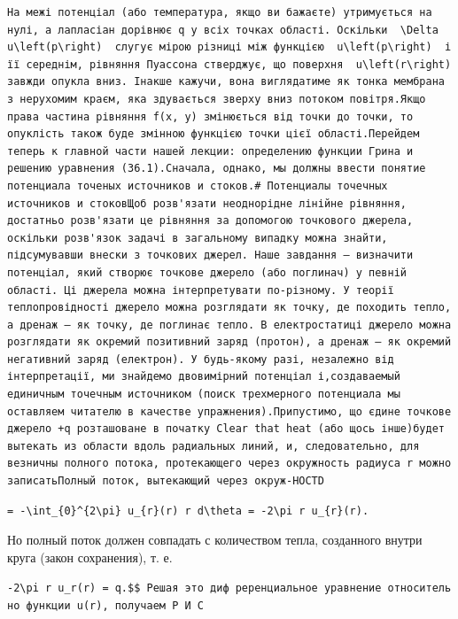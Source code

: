 \documentclass[
  ukrainian,
]{article}
\begin{document}
\begin{verbatim}
На межі потенціал (або температура, якщо ви бажаєте) утримується на нулі, а лапласіан дорівнює q у всіх точках області. Оскільки  \Delta u\left(p\right)  слугує мірою різниці між функцією  u\left(p\right)  і її середнім, рівняння Пуассона стверджує, що поверхня  u\left(r\right)  завжди опукла вниз. Інакше кажучи, вона виглядатиме як тонка мембрана з нерухомим краєм, яка здувається зверху вниз потоком повітря.Якщо права частина рівняння f(x, y) змінюється від точки до точки, то опуклість також буде змінною функцією точки цієї області.Перейдем теперь к главной части нашей лекции: определению функции Грина и решению уравнения (36.1).Сначала, однако, мы должны ввести понятие потенциала точеных источников и стоков.# Потенциалы точечных источников и стоковЩоб розв'язати неоднорідне лінійне рівняння, достатньо розв'язати це рівняння за допомогою точкового джерела, оскільки розв'язок задачі в загальному випадку можна знайти, підсумувавши внески з точкових джерел. Наше завдання — визначити потенціал, який створює точкове джерело (або поглинач) у певній області. Ці джерела можна інтерпретувати по-різному. У теорії теплопровідності джерело можна розглядати як точку, де походить тепло, а дренаж — як точку, де поглинає тепло. В електростатиці джерело можна розглядати як окремий позитивний заряд (протон), а дренаж — як окремий негативний заряд (електрон). У будь-якому разі, незалежно від інтерпретації, ми знайдемо двовимірний потенціал і,создаваемый единичным точечным источником (поиск трехмерного потенциала мы оставляем читателю в качестве упражнения).Припустимо, що єдине точкове джерело +q розташоване в початку Clear that heat (або щось інше)будет вытекать из области вдоль радиальных линий, и, следовательно, для везничны полного потока, протекающего через окружность радиуса r можно записатьПолный поток, вытекающий через окруж-HOCTD
\end{verbatim}

\begin{verbatim}
= -\int_{0}^{2\pi} u_{r}(r) r d\theta = -2\pi r u_{r}(r).
\end{verbatim}

Но полный поток должен совпадать с количеством тепла, созданного внутри
круга (закон сохранения), т. е.

\texttt{-2\textbackslash{}pi\ r\ \textquotesingle{}u\_r\textquotesingle{}(r)\ =\ q.\$\$\ Решая\ это\ диф\ реренциальное\ уравнение\ относительно\ функции\ \textquotesingle{}u(r)\textquotesingle{},\ получаем\ Р\ И\ С}
\end{document}
